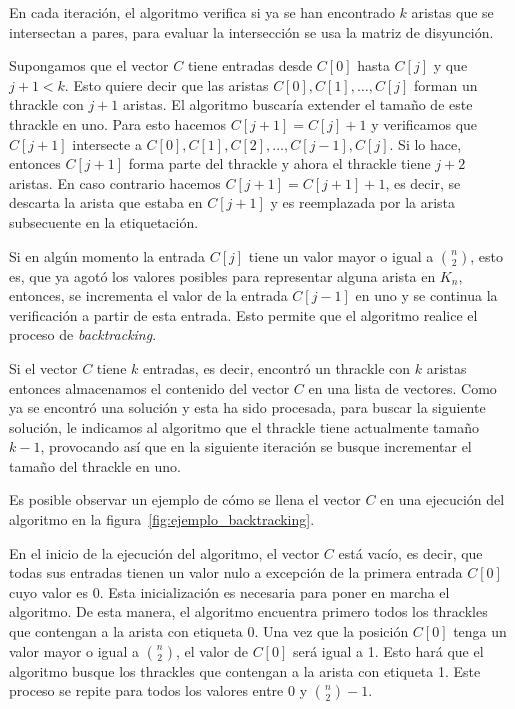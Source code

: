   En cada iteración, el algoritmo verifica si ya se han encontrado $k$ aristas
  que se intersectan a pares, para evaluar la intersección se usa la matriz de
  disyunción.

  Supongamos que el vector $C$ tiene entradas desde $C[0]$ hasta $C[j]$ y que
  $j+1 < k$. Esto quiere decir que las aristas $C[0],C[1],\dots,C[j]$ forman un
  thrackle con $j+1$ aristas. El algoritmo buscaría extender el tamaño de este
  thrackle en uno. Para esto hacemos $C[j+1]=C[j]+1$ y verificamos que $C[j+1]$
  intersecte a $C[0],C[1],C[2],\dots,C[j-1],C[j]$. Si lo hace, entonces
  $C[j+1]$ forma parte del thrackle y ahora el thrackle tiene $j+2$ aristas. En
  caso contrario hacemos $C[j+1]=C[j+1]+1$, es decir, se descarta la arista que
  estaba en $C[j+1]$ y es reemplazada por la arista subsecuente en la
  etiquetación.

  Si en algún momento la entrada $C[j]$ tiene un valor mayor o igual a
  $\binom{n}{2}$, esto es, que ya agotó los valores posibles para representar
  alguna arista en $K_n$, entonces, se incrementa el valor de la entrada
  $C[j-1]$ en uno y se continua la verificación a partir de esta entrada. Esto
  permite que el algoritmo realice el proceso de \emph{backtracking}.

  Si el vector $C$ tiene $k$ entradas, es decir, encontró un thrackle con $k$
  aristas entonces almacenamos el contenido del vector $C$ en una lista de
  vectores. Como ya se encontró una solución y esta ha sido procesada, para
  buscar la siguiente solución, le indicamos al algoritmo que el thrackle tiene
  actualmente tamaño $k-1$, provocando así que en la siguiente iteración se
  busque incrementar el tamaño del thrackle en uno.

  Es posible observar un ejemplo de cómo se llena el vector $C$ en una
  ejecución del algoritmo en la figura~\ref{fig:ejemplo_backtracking}.

  En el  inicio de la ejecución del algoritmo, el vector $C$ está vacío, es
  decir, que  todas sus entradas tienen un valor nulo a excepción de la primera
  entrada $C[0]$ cuyo valor es 0. Esta inicialización es necesaria para poner
  en marcha el algoritmo. De esta manera, el algoritmo encuentra primero todos
  los thrackles que contengan a la arista con etiqueta 0. Una vez que la
  posición $C[0]$ tenga un valor mayor o igual a $\binom{n}{2}$, el valor de
  $C[0]$ será igual a 1. Esto hará que el algoritmo busque los thrackles que
  contengan a la arista con etiqueta 1. Este proceso se repite para todos los
  valores entre $0$ y $\binom{n}{2}-1$.

